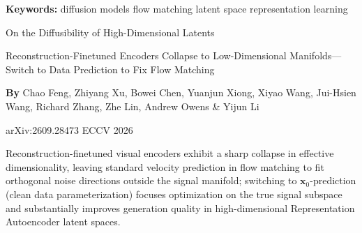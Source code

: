 \documentclass[10pt,twocolumn]{article}
\begin{document}
\setlength{\parindent}{0pt}
\setlength{\parskip}{4pt}

{\small\color{keywordgray}\textbf{Keywords:}
  diffusion models \textbullet{}
  flow matching \textbullet{}
  latent space \textbullet{}
  representation learning}\par\vspace{4pt}

{\LARGE\bfseries\raggedright
  On the Diffusibility of High-Dimensional Latents}\par\vspace{4pt}

{\large\itshape\raggedright
  Reconstruction-Finetuned Encoders Collapse to Low-Dimensional
  Manifolds---Switch to Data Prediction to Fix Flow Matching}\par\vspace{6pt}

{\small\textbf{By} Chao Feng, Zhiyang Xu, Bowei Chen, Yuanjun Xiong,
  Xiyao Wang, Jui-Hsien Wang, Richard Zhang, Zhe Lin, Andrew Owens
  \& Yijun Li}\par\vspace{2pt}

{\small\color{keywordgray}arXiv:2609.28473 \textbullet{} ECCV 2026}
\par\vspace{2pt}\noindent{\color{rulered}\rule{\columnwidth}{0.6pt}}\vspace{6pt}

Reconstruction-finetuned visual encoders exhibit a sharp collapse in effective
dimensionality, leaving standard velocity prediction in flow matching to fit
orthogonal noise directions outside the signal manifold; switching to
$\mathbf{x}_0$-prediction (clean data parameterization) focuses optimization
on the true signal subspace and substantially improves generation quality in
high-dimensional Representation Autoencoder latent spaces.
\end{document}
